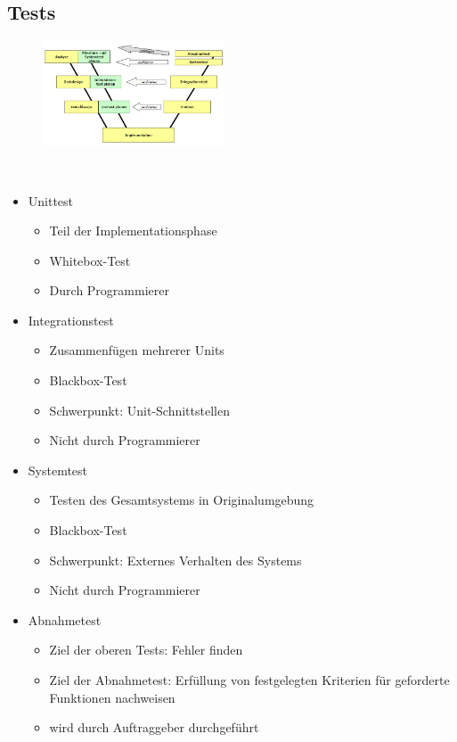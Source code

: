 \subsection{Tests}
\begin{figure}
    \vspace{-12pt}
    \centering
    \includegraphics[width=0.48\textwidth]{images/VerifikationValidation/vmodell}
\end{figure}
\ 
\vspace{-10pt}
\begin{itemize}
	\item Unittest
		\begin{itemize}
			\item Teil der Implementationsphase
			\item Whitebox-Test
			\item Durch Programmierer
		\end{itemize}
	\item Integrationstest
		\begin{itemize}
			\item Zusammenfügen mehrerer Units
			\item Blackbox-Test
			\item Schwerpunkt: Unit-Schnittstellen
			\item Nicht durch Programmierer
		\end{itemize}
	\item Systemtest
		\begin{itemize}
			\item Testen des Gesamtsystems in Originalumgebung
			\item Blackbox-Test
			\item Schwerpunkt: Externes Verhalten des Systems
			\item Nicht durch Programmierer
		\end{itemize}
    \item Abnahmetest
	    \begin{itemize}
		    \item Ziel der oberen Tests: Fehler finden
		    \item Ziel der Abnahmetest: Erfüllung von festgelegten Kriterien für geforderte Funktionen nachweisen 
		    \item wird durch Auftraggeber durchgeführt
	    \end{itemize}
\end{itemize}

